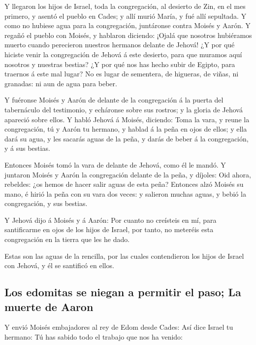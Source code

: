  Y llegaron los hijos de Israel, toda la congregación, al
desierto de Zin, en el mes primero, y asentó el pueblo en Cades; y allí
murió María, y fué allí sepultada.  Y como no hubiese agua
para la congregación, juntáronse contra Moisés y Aarón.  Y
regañó el pueblo con Moisés, y hablaron diciendo: ¡Ojalá que nosotros
hubiéramos muerto cuando perecieron nuestros hermanos delante de Jehová!
 ¿Y por qué hiciste venir la congregación de Jehová á este
desierto, para que muramos aquí nosotros y nuestras bestias?
 ¿Y por qué nos has hecho subir de Egipto, para traernos á
este mal lugar? No es lugar de sementera, de higueras, de viñas, ni
granadas: ni aun de agua para beber.

 Y fuéronse Moisés y Aarón de delante de la congregación á
la puerta del tabernáculo del testimonio, y echáronse sobre sus rostros;
y la gloria de Jehová apareció sobre ellos.  Y habló
Jehová á Moisés, diciendo:  Toma la vara, y reune la
congregación, tú y Aarón tu hermano, y hablad á la peña en ojos de
ellos; y ella dará su agua, y les sacarás aguas de la peña, y darás de
beber á la congregación, y á sus bestias.

 Entonces Moisés tomó la vara de delante de Jehová, como
él le mandó.  Y juntaron Moisés y Aarón la congregación
delante de la peña, y díjoles: Oid ahora, rebeldes: ¿os hemos de hacer
salir aguas de esta peña?  Entonces alzó Moisés su mano,
é hirió la peña con su vara dos veces: y salieron muchas aguas, y bebió
la congregación, y sus bestias.

 Y Jehová dijo á Moisés y á Aarón: Por cuanto no
creísteis en mí, para santificarme en ojos de los hijos de Israel, por
tanto, no meteréis esta congregación en la tierra que les he dado.

 Estas son las aguas de la rencilla, por las cuales
contendieron los hijos de Israel con Jehová, y él se santificó en ellos.

\hypertarget{los-edomitas-se-niegan-a-permitir-el-paso-la-muerte-de-aaron}{%
\subsection{Los edomitas se niegan a permitir el paso; La muerte de
Aaron}\label{los-edomitas-se-niegan-a-permitir-el-paso-la-muerte-de-aaron}}

 Y envió Moisés embajadores al rey de Edom desde Cades:
Así dice Israel tu hermano: Tú has sabido todo el trabajo que nos ha
venido:

